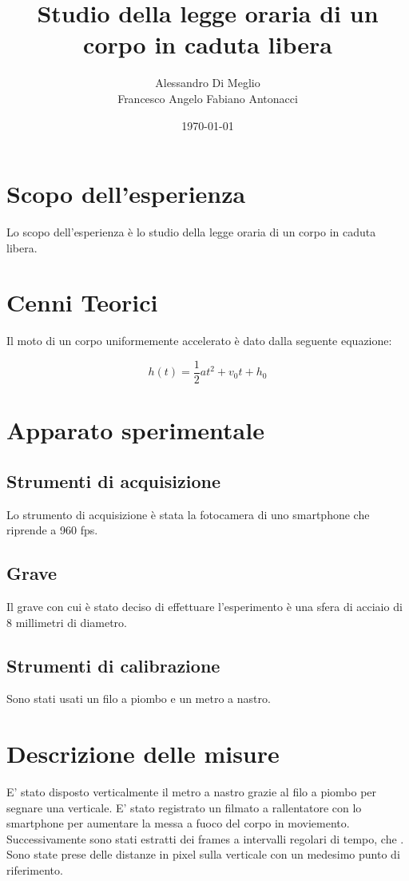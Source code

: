 \documentclass{article}
\title{Studio della legge oraria di un corpo in caduta libera}
\author{Alessandro Di Meglio\\Francesco Angelo Fabiano Antonacci}
\date{\today}
\begin{document}
\maketitle

\section{Scopo dell'esperienza}
Lo scopo dell’esperienza è lo studio della legge oraria di un corpo in caduta libera.

\section {Cenni Teorici}
Il moto di un corpo uniformemente accelerato è dato dalla seguente equazione:

\begin{equation}
h(t)=\frac{1}{2}at^2+v_0t+h_0
\label{fond}
\end{equation}


\section{Apparato sperimentale}
\subsection{Strumenti di acquisizione}
Lo strumento di acquisizione è stata la fotocamera di uno smartphone che riprende a 960 fps.

\subsection{Grave}
Il grave con cui è stato deciso di effettuare l'esperimento è una sfera di acciaio di 8 millimetri di diametro.

\subsection{Strumenti di calibrazione}
Sono stati usati un filo a piombo e un metro a nastro. 


\section{Descrizione delle misure}
E' stato disposto verticalmente il metro a nastro grazie al filo a piombo per segnare una verticale.
E' stato registrato un filmato a rallentatore con lo smartphone per aumentare la messa a fuoco del corpo in moviemento. 
Successivamente sono stati estratti dei frames a intervalli regolari di tempo, che .
Sono state prese delle distanze in pixel sulla verticale con un medesimo punto di riferimento.
\end{document}
